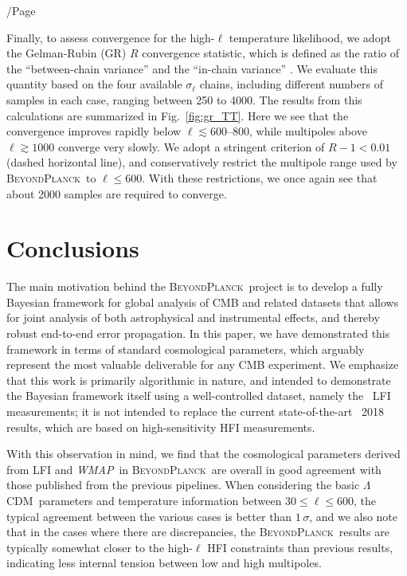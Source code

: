 /Page\documentclass[twocolumn]{aa}
\def\WMAP{\textit{WMAP}}
\def\LCDM{$\Lambda$CDM}
\newcommand{\BP}{\textsc{BeyondPlanck}}
\begin{document}
Finally, to assess convergence for the high-$\ell$ temperature
likelihood, we adopt the Gelman-Rubin (GR) $R$ convergence statistic,
which is defined as the ratio of the ``between-chain variance'' and
the ``in-chain variance'' \citep{gelman:1992}. We evaluate this
quantity based on the four available $\sigma_{\ell}$ chains, including
different numbers of samples in each case, ranging between 250 to
4000. The results from this calculations are summarized in
Fig.~\ref{fig:gr_TT}. Here we see that the convergence improves
rapidly below $\ell\lesssim600$--800, while multipoles above
$\ell\gtrsim 1000$ converge very slowly. We adopt a stringent
criterion of $R-1 < 0.01$ (dashed horizontal line), and conservatively
restrict the multipole range used by \BP\ to $\ell\le600$. With these
restrictions, we once again see that about 2000 samples are required
to converge.

\section{Conclusions}
\label{sec:conclusions}

The main motivation behind the \BP\ project is to develop a fully
Bayesian framework for global analysis of CMB and related datasets
that allows for joint analysis of both astrophysical and instrumental
effects, and thereby robust end-to-end error propagation. In this
paper, we have demonstrated this framework in terms of standard
cosmological parameters, which arguably represent the most valuable
deliverable for any CMB experiment. We emphasize that this work is
primarily algorithmic in nature, and intended to demonstrate the
Bayesian framework itself using a well-controlled dataset, namely the
\Planck\ LFI measurements; it is not intended to replace the current
state-of-the-art \Planck\ 2018 results, which are based on
high-sensitivity HFI measurements.

With this observation in mind, we find that the cosmological
parameters derived from LFI and \WMAP\ in \BP\ are overall in good
agreement with those published from the previous pipelines. When
considering the basic \LCDM\ parameters and temperature information
between $30\le\ell\le600$, the typical agreement between the various
cases is better than $1\,\sigma$, and we also note that in the cases
where there are discrepancies, the \BP\ results are typically somewhat
closer to the high-$\ell$ HFI constraints than previous results,
indicating less internal tension between low and high multipoles.
\end{document}
